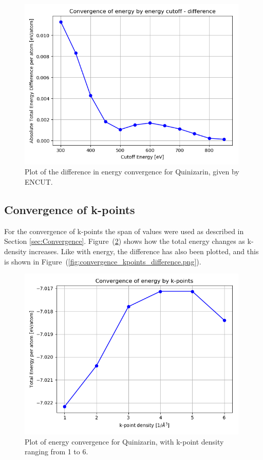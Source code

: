 \documentclass{article}
\begin{document}
    \begin{figure}[H]
      \centering
      \includegraphics[width = 11cm]{../fig/convergence_energy_difference.png}
      \caption{Plot of the difference in energy convergence for Quinizarin, given by ENCUT. }
      \label{fig:convergence_energy_difference.png}
    \end{figure}
    \fi

  \subsection{Convergence of k-points}

    For the convergence of k-points the span of values were used as described in Section \ref{sec:Convergence}. Figure~(\ref{fig:convergence_kpoints.png}) shows how the total energy changes as k-density increases. Like with energy, the difference has also been plotted, and this is shown in Figure~(\ref{fig:convergence_kpoints_difference.png}).

    \iffalse
    \begin{figure}[H]
        \centering
        \includegraphics[width = 11cm]{../fig/convergence_kpoints.png}
        \caption{Plot of energy convergence for Quinizarin, with k-point density ranging from 1 to 6. }
        \label{fig:convergence_kpoints.png}
    \end{figure}
\end{document}
